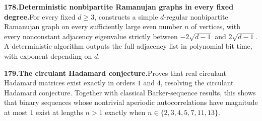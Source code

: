 \documentclass[11pt,a4paper]{article}
\begin{document}
  \par \begin{minipage}{\linewidth}
  \fontsize{10.5}{12.6}\selectfont\RaggedRight
  \hypertarget{result 178}{}
  {\bfseries\textcolor{muted}{178.}\enspace Deterministic nonbipartite Ramanujan graphs in every fixed degree.}\enspace For every fixed $d\ge3$, constructs a simple $d$-regular nonbipartite Ramanujan graph on every sufficiently large even number $n$ of vertices, with every nonconstant adjacency eigenvalue strictly between $-2\sqrt{d-1}$ and $2\sqrt{d-1}$. A deterministic algorithm outputs the full adjacency list in polynomial bit time, with exponent depending on $d$.\par
  \end{minipage}\par\vspace{5pt}



  \par \begin{minipage}{\linewidth}
  \fontsize{10.5}{12.6}\selectfont\RaggedRight
  \hypertarget{result 179}{}
  {\bfseries\textcolor{muted}{179.}\enspace The circulant Hadamard conjecture.}\enspace Proves that real circulant Hadamard matrices exist exactly in orders $1$ and $4$, resolving the circulant Hadamard conjecture. Together with classical Barker-sequence results, this shows that binary sequences whose nontrivial aperiodic autocorrelations have magnitude at most $1$ exist at lengths $n>1$ exactly when $n\in\{2,3,4,5,7,11,13\}$.\par
  \end{minipage}\par\vspace{5pt}
\end{document}
